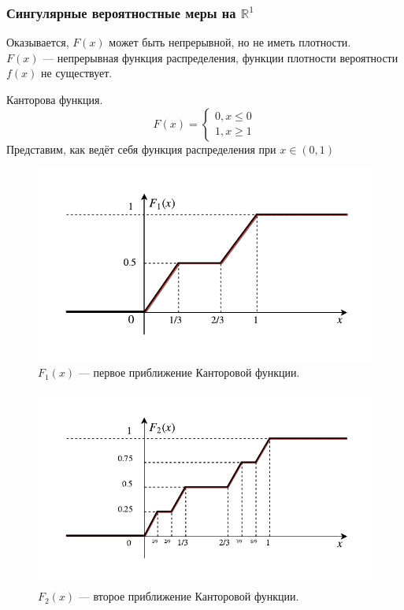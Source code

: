 \subsubsection{Сингулярные вероятностные меры на $\mathbb{R}^1$}
Оказывается, $F(x)$ может быть непрерывной, но не иметь плотности. \\
$F(x)$ --- непрерывная функция распределения, функции плотности вероятности $f(x)$ не существует.
\begin{example} Канторова функция.
	\[
		F(x) =
		\begin{cases}
			0, x \leqslant 0 \\
			1, x \geqslant 1
		\end{cases}
	\]
	Представим, как ведёт себя функция распределения при $x \in (0, 1)$




	

	\begin{figure}[H]
	\begin{center}
	\includegraphics[width=\textwidth,height=\textheight,keepaspectratio]{Images/plot2-2.pdf}
	\end{center}
	\caption{$F_1(x)$ --- первое приближение Канторовой функции.}
	\end{figure}
	\begin{figure}[H]
	\begin{center}
	\includegraphics[width=\textwidth,height=\textheight,keepaspectratio]{Images/plot2-3.pdf}
	\end{center}
	\caption{$F_2(x)$ --- второе приближение Канторовой функции.}
	\end{figure}


\end{example}
